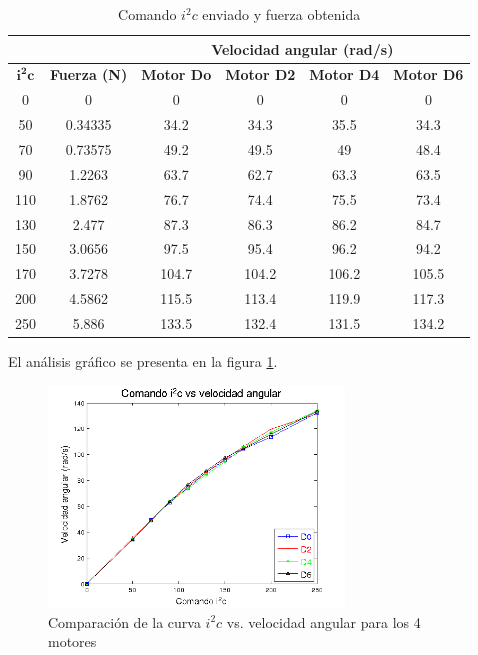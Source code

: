 \documentclass[spanish,12pt,a4paper,titlepage]{report}
\begin{document}
\begin{table}[H]
\centering
\begin{tabular}{|c|c|c|c|c|c|} 
	\cline{3-6} \multicolumn{1}{c}{} & \multicolumn{1}{c}{} & 
	\multicolumn{4}{|c|}{\cellcolor[gray]{0.6}Velocidad angular (rad/s)} \\ \hline
	\cellcolor[gray]{0.8} {$\mathbf{i^2c}$} & 
	\cellcolor[gray]{0.8} \textbf{Fuerza (N)} &
	\cellcolor[gray]{0.8} \textbf{Motor Do} &
	\cellcolor[gray]{0.8} \textbf{Motor D2} &
	\cellcolor[gray]{0.8} \textbf{Motor D4} &
	\cellcolor[gray]{0.8} \textbf{Motor D6}   \\ \hline \hline
	  0 &      0 &    0 &    0 &    0 &    0 \\ \hline
	 50 &0.34335 & 34.2 & 34.3 & 35.5 & 34.3 \\ \hline
	 70 &0.73575 & 49.2 & 49.5 &   49 & 48.4 \\ \hline
	 90 & 1.2263 & 63.7 & 62.7 & 63.3 & 63.5 \\ \hline
	110 & 1.8762 & 76.7 & 74.4 & 75.5 & 73.4 \\ \hline
	130 &  2.477 & 87.3 & 86.3 & 86.2 & 84.7 \\ \hline
	150 & 3.0656 & 97.5 & 95.4 & 96.2 & 94.2 \\ \hline
	170 & 3.7278 &104.7 &104.2 &106.2 &105.5 \\ \hline
	200 & 4.5862 &115.5 &113.4 &119.9 &117.3 \\ \hline
	250 &  5.886 &133.5 &132.4 &131.5 &134.2 \\ \hline
\end{tabular}
\caption{Comando $i^2c$ enviado y fuerza obtenida}
\label{tab:motores}
\end{table}

El análisis gráfico se presenta en la figura \ref{fig:motores}.

\begin{figure}[h!]
  \begin{center}
	\includegraphics[width=0.7\textwidth]{./Pics/motores.png}
  \end{center}
  \caption{Comparación de la curva $i^2c$ vs. velocidad angular para los 4 motores}
  \label{fig:motores}
\end{figure}
\end{document}
